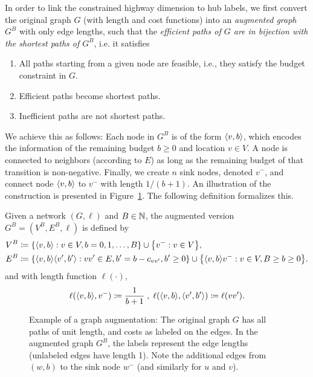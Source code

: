 \label{sec:augmented}
In order to link the constrained highway dimension to hub labels, we first convert the original graph $G$ (with length and cost functions) into an \emph{augmented graph} $G^B$ with only edge lengths, such that the \emph{efficient paths of $G$ are in bijection with the shortest paths of $G^B$}, i.e. it satisfies
\begin{enumerate}[nosep]
\item All paths starting from a given node are feasible, i.e., they satisfy the budget constraint in $G$.
\item Efficient paths become shortest paths.
\item Inefficient paths are not shortest paths.
\end{enumerate}
We achieve this as follows: Each node in $G^B$ is of the form $\langle v,b\rangle$, which encodes the information of the remaining budget $b\geq 0$ and location $v\in V$.
A node is connected to neighbors (according to $E$) as long as the remaining budget of that transition is non-negative.
Finally, we create $n$ sink nodes, denoted $v^-$, and connect node $\langle v,b\rangle$ to $v^-$ with length $1/(b+1)$.
An illustration of the construction is presented in Figure~\ref{fig:augmented}.
The following definition formalizes this. 

\begin{definition}
Given a network $(G,\ell)$ and $B\in\mathbb{N}$, the augmented version $G^B=(V^B,E^B,\ell)$ is defined by
\begin{align*}
V^B &\defeq\crl*{\pp{v,b}: v\in V, b=0,1,\ldots,B}\cup\crl*{v^-:v\in V},\\
E^B &\defeq\crl*{\pp{v,b}\pp{v',b'} : vv'\in E, b'=b-c_{vv'}, b'\geq 0}\cup \crl*{\pp{v,b}v^-: v\in V, B\geq b\geq 0}.
\end{align*}
and with length function $\ell(\cdot)$,
\begin{align*}
\ell(\langle v,b\rangle,v^-) \coloneqq \frac{1}{b+1}\;,\;
\ell(\langle v,b\rangle,\langle v',b'\rangle) \coloneqq \ell(vv').
\end{align*}
\end{definition}

\begin{figure}

\caption{Example of a graph augmentation: The original graph $G$ has all paths of unit length, and costs as labeled on the edges. In the augmented graph $G^B$, the labels represent the edge lengths (unlabeled edges have length 1). Note the additional edges from $(w,b)$ to the sink node $w^-$ (and similarly for $u$ and $v$). 
}
\label{fig:augmented}
\end{figure}

